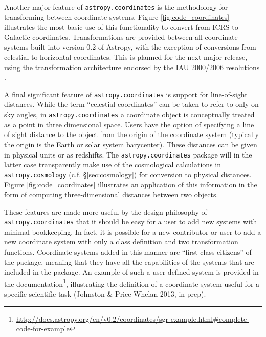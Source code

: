 \documentclass[traditabstract]{aa}
\begin{document}
Another major feature of \texttt{astropy.coordinates} is the methodology for
transforming between coordinate systems. Figure \ref{fig:code_coordinates}
illustrates the most basic use of this functionality to convert from ICRS to
Galactic coordinates. Transformations are provided between all coordinate
systems built into version 0.2 of Astropy, with the exception of conversions
from celestial to horizontal coordinates. This is planned for the next major
release, using the transformation architecture endorsed by the IAU 2000/2006
resolutions \citep[see e.g.,][]{soffel03, usnocircular179}.

A final significant feature of \texttt{astropy.coordinates} is support for
line-of-sight distances. While the term ``celestial coordinates'' can be taken
to refer to only on-sky angles, in \texttt{astropy.coordinates} a coordinate
object is conceptually treated as a point in three dimensional space. Users
have the option of specifying a line of sight distance to the object from the
origin of the coordinate system (typically the origin is the Earth or solar
system barycenter). These distances can be given in physical units or as
redshifts. The \texttt{astropy.coordinates} package will in the latter case
transparently make use of the cosmological calculations in
\texttt{astropy.cosmology} (c.f. \S\ref{sec:cosmology}) for conversion to
physical distances. Figure \ref{fig:code_coordinates} illustrates an
application of this information in the form of computing three-dimensional
distances between two objects.

These features are made more useful by the design philosophy of
\texttt{astropy.coordinates} that it should be easy for a user to add new
systems with minimal bookkeeping. In fact, it is possible for a new contributor
or user to add a new coordinate system with only a class definition and two
transformation functions. Coordinate systems added in this manner are
``first-class citizens'' of the package, meaning that they have all the
capabilities of the systems that are included in the package. An example of
such a user-defined system is provided in the
documentation\footnote{\url{http://docs.astropy.org/en/v0.2/coordinates/sgr-example.html#complete-code-for-example}},
illustrating the definition of a coordinate system useful for a specific
scientific task (Johnston \& Price-Whelan 2013, in prep).

\end{document}
